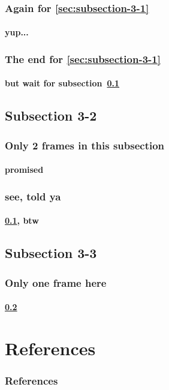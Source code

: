 \documentclass[blue]{beamer}
\begin{document}
\begin{frame}
  \frametitle{Again for \ref{sec:subsection-3-1}}
  \framesubtitle{yup...}

\end{frame}

\begin{frame}
  \frametitle{The end for \ref{sec:subsection-3-1}}
  \framesubtitle{but wait for subsection~\ref{sec:subsection-3-2}}

\end{frame}

\subsection{Subsection 3-2}
\label{sec:subsection-3-2}

\begin{frame}
  \frametitle{Only 2 frames in this subsection}
  \framesubtitle{promised}

\end{frame}

\begin{frame}
  \frametitle{see, told ya}
  \framesubtitle{\ref{sec:subsection-3-2}, btw}

\end{frame}

\subsection{Subsection 3-3}
\label{sec:subsection-3-3}

\begin{frame}
  \frametitle{Only one frame here}
  \framesubtitle{\ref{sec:subsection-3-3}}

\end{frame}

\appendix

\section*{References}

\begin{frame}[allowframebreaks]
  \frametitle{References}
    

  
  
\end{frame}
\end{document}
